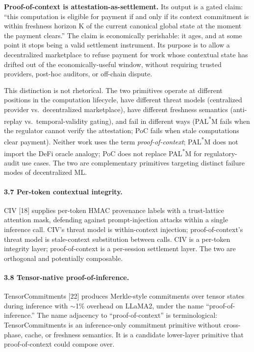 \documentclass[11pt]{article}
\begin{document}
\textbf{Proof-of-context is attestation-as-settlement.} Its output is a gated claim: ``this computation is eligible for payment if and only if its context commitment is within freshness horizon K of the current canonical global state at the moment the payment clears.'' The claim is economically perishable: it ages, and at some point it stops being a valid settlement instrument. Its purpose is to allow a decentralized marketplace to refuse payment for work whose contextual state has drifted out of the economically-useful window, without requiring trusted providers, post-hoc auditors, or off-chain dispute.

This distinction is not rhetorical. The two primitives operate at different positions in the computation lifecycle, have different threat models (centralized provider vs.\ decentralized marketplace), have different freshness semantics (anti-replay vs.\ temporal-validity gating), and fail in different ways (PAL\textsuperscript{*}M fails when the regulator cannot verify the attestation; PoC fails when stale computations clear payment). Neither work uses the term \emph{proof-of-context}; PAL\textsuperscript{*}M does not import the DeFi oracle analogy; PoC does not replace PAL\textsuperscript{*}M for regulatory-audit use cases. The two are complementary primitives targeting distinct failure modes of decentralized ML.

\paragraph{3.7 Per-token contextual integrity.} CIV [18] supplies per-token HMAC provenance labels with a trust-lattice attention mask, defending against prompt-injection attacks within a single inference call. CIV's threat model is within-context injection; proof-of-context's threat model is stale-context substitution between calls. CIV is a per-token integrity layer; proof-of-context is a per-session settlement layer. The two are orthogonal and potentially composable.

\paragraph{3.8 Tensor-native proof-of-inference.} TensorCommitments [22] produces Merkle-style commitments over tensor states during inference with $\sim$1\% overhead on LLaMA2, under the name ``proof-of-inference.'' The name adjacency to ``proof-of-context'' is terminological: TensorCommitments is an inference-only commitment primitive without cross-phase, cache, or freshness semantics. It is a candidate lower-layer primitive that proof-of-context could compose over.
\end{document}
